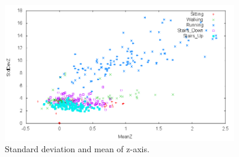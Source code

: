 \begin{figure}[ht]
    \centering
    \includegraphics[width=0.9\textwidth]{../../data/training-plots/Z.png}
    \caption{Standard deviation and mean of z-axis.}
    \label{fig:training-plot-z}
\end{figure}
